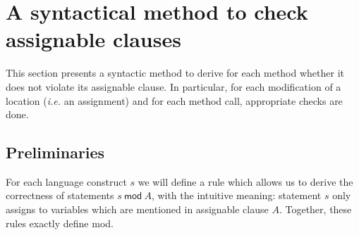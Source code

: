 \documentclass[a4paper]{llncs}
\newcommand{\java}{\textsc{Java}}
\newcommand{\MOD}[2]{\ensuremath{\mathit{#1}\:\mathsf{mod}\:\ensuremath{\mathit{#2}}}}
\begin{document}














\section{A syntactical method to check assignable clauses}
\label{sec-syn-met-che-ass-cla}

This section presents a syntactic method to derive for each method
whether it does not violate its assignable clause. In particular, for
each modification of a location (\emph{i.e.} an assignment) and for
each method call, appropriate checks are done.


\subsection{Preliminaries}
For each language construct \(s\) we will define a rule
which allows us to derive the correctness of statements
\MOD{s}{A}, with the intuitive meaning: statement \(s\) only assigns
to variables which are mentioned in assignable clause \(A\). Together,
these rules exactly define \textsf{mod}.
\end{document}
